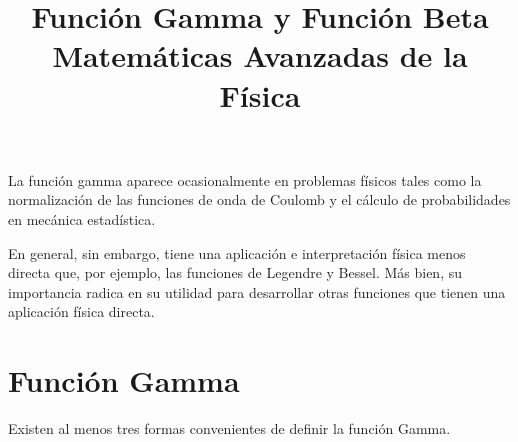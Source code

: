 

\title{Función Gamma y Función Beta \\ {\large Matemáticas Avanzadas de la Física}}
\date{ }

\renewcommand\labelenumii{\theenumi.{\arabic{enumii}}}
\maketitle
\fontsize{14}{14}\selectfont
La función gamma aparece ocasionalmente en problemas físicos tales como la normalización de las funciones de onda de Coulomb y el cálculo de probabilidades en mecánica estadística.
\par
En general, sin embargo, tiene una aplicación e interpretación física menos directa que, por ejemplo, las funciones de Legendre y Bessel. Más bien, su importancia radica en su utilidad para desarrollar otras funciones que tienen una aplicación física directa.
\section{Función Gamma}
Existen al menos tres formas convenientes de definir la función Gamma.
